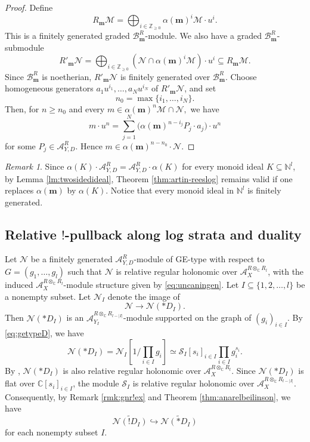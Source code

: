 \documentclass{amsart}
\theoremstyle{plain}
\numberwithin{theorem}{section}
\theoremstyle{definition}
\theoremstyle{remark}
\newtheorem{remark}[theorem]{Remark}
\theoremstyle{definition}
\newcommand{\wt}{\widetilde}
\newcommand{\C}{\mathbb{C}} %
\newcommand{\N}{\mathbb{N}}
\newcommand{\Z}{\mathbb{Z}}
\newcommand{\cM}{\mathcal{M}}
\newcommand{\cN}{\mathcal{N}}
\newcommand{\cS}{\mathcal{S}}
\newcommand{\bm}{\mathbf{m}}
\newcommand{\sB}{\mathscr{B}}
\newcommand{\sA}{\mathscr{A}}
\begin{document}
\begin{proof}
Define
\[
R_\bm\cM
=
\bigoplus_{i\in \Z_{\ge 0}}
\alpha(\bm)^i\cM\cdot u^i.
\]
This is a finitely generated graded $\sB^R_\bm$-module. We also have a
graded $\sB^R_\bm$-submodule
\[
R'_\bm\cN
=
\bigoplus_{i\in \Z_{\ge 0}}
(\cN\cap \alpha(\bm)^i\cM)\cdot u^i
\subseteq
R_\bm\cM.
\]
Since $\sB_\bm^R$ is noetherian, $R'_\bm\cN$ is finitely generated over
$\sB_\bm^R$. Choose homogeneous generators
$a_1u^{i_1},\dots,a_Nu^{i_N}$
of $R'_\bm\cN$, and set
\[
n_0=\max\{i_1,\dots,i_N\}.
\]
Then, for $n\ge n_0$ and every
$m\in \alpha(\bm)^n\cM\cap \cN,$
we have
\[
m\cdot u^n
=
\sum_{j=1}^N
\big(\alpha(\bm)^{n-i_j}P_j\cdot a_j\big)\cdot u^n
\]
for some $P_j\in \sA^R_{Y,D}$. Hence
$m\in \alpha(\bm)^{n-n_0}\cdot\cN.$
\end{proof}

\begin{remark}
Since
$\alpha(K)\cdot\sA^R_{Y,D}
=
\sA^R_{Y,D}\cdot\alpha(K)$
for every monoid ideal $K\subseteq \N^l$, by Lemma \ref{lm:twosidedideal},
Theorem \ref{thm:artin-reeslog} remains valid if one replaces
$\alpha(\bm)$ by $\alpha(K)$. Notice that every monoid ideal in $\N^l$ is
finitely generated.
\end{remark}


\subsection{Relative $!$-pullback along log strata and duality}
\label{subsect:r!pullback}

Let $\cN$ be a finitely generated $\sA^R_{Y,D}$-module of GE-type with
respect to
$G=(g_1,\dots,g_l)$
such that $\cN$ is relative regular holonomic over
$\sA^{R\otimes_\C R_l}_X$, with the induced
$\sA^{R\otimes_\C R_l}_X$-module structure given by
\eqref{eq:uncaningen}. Let
$I\subseteq \{1,2,\dots,l\}$
be a nonempty subset. Let $\cN_I$ denote the image of
\[
\cN\longrightarrow \cN(*D_I).
\]
Then $\cN(*D_I)$ is an
$\sA^{R\otimes_\C R_{l-|I|}}_{Y_I}$-module supported on the graph of
$(g_i)_{i\in I}$. By \eqref{eq:getypeD}, we have
\[
\cN(*D_I)
=
\cN_I\left[1/\prod_{i\in I}g_i\right]
\simeq
\cS_I[s_i]_{i\in I}\prod_{i\in I}g_i^{s_i}.
\]
By \cite[Cor.4.31]{FFS23}, $\cN(*D_I)$ is also relative regular holonomic
over $\sA^{R\otimes_\C R_l}_X$. Since $\cN(*D_I)$ is flat over
$\C[s_i]_{i\in I}$, the module $\cS_I$ is relative regular holonomic over
$\sA^{R\otimes_\C R_{l-|I|}}_X$. Consequently, by Remark
\ref{rmk:gnr!ex} and Theorem \ref{thm:anarelbeilinson}, we have
\[
\wt{\cN(!D_I)}
\hookrightarrow
\wt{\cN(*D_I)}
\]
for each nonempty subset $I$.
\end{document}
